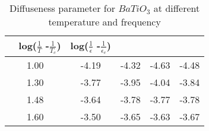 \begin{table}[H]
    \centering
    \begin{tabular}{|c|c|c|c|c|}
        \hline
        ~ log($\frac{1}{T}$ -$\frac{1}{T_c}$) & log($\frac{1}{\epsilon}$ -$\frac{1}{\epsilon_c}$)                                              \\ \hline
        1.00 & -4.19 & -4.32 & -4.63 & -4.48 \\ \hline
        1.30 & -3.77 & -3.95 & -4.04 & -3.84 \\ \hline
        1.48 & -3.64 & -3.78 & -3.77 & -3.78 \\ \hline
        1.60 & -3.50 & -3.65 & -3.63 & -3.67 \\ \hline
    \end{tabular}
    \caption{Diffuseness
        parameter for $BaTiO_3$ at different temperature  and frequency}
    \label{tab:8}
\end{table}